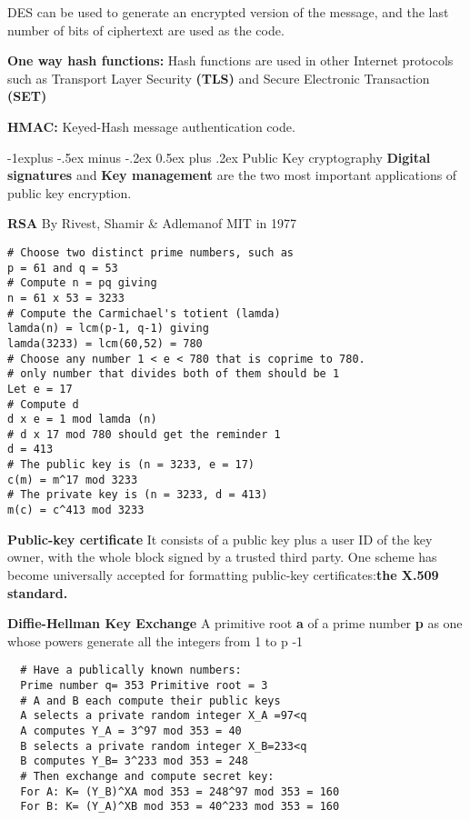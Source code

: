 \documentclass[10pt,landscape]{article}
\makeatletter
\renewcommand{\subsection}{\@startsection{subsection}{2}{0mm}%
    {-1explus -.5ex minus -.2ex}%
    {0.5ex plus .2ex}%
    {\normalfont\normalsize\bfseries}}
\makeatother
\begin{document}
\begin{multicols}{3}
DES can be used to generate an encrypted version of the message, and
the last number of bits of ciphertext are used as the code.

\textbf{One way hash functions:} Hash functions are used in other Internet protocols such as Transport
Layer Security \textbf{(TLS)} and Secure Electronic Transaction \textbf{(SET)}

\textbf{HMAC:} Keyed-Hash message authentication code.

\subsection{Public Key cryptography}
\textbf{Digital signatures} and \textbf{Key management} are the two most important applications of
public key encryption.

\textbf{RSA} By Rivest, Shamir \& Adlemanof MIT in 1977

\lstset{language=bash,label= ,caption= ,captionpos=b,numbers=none}
\begin{lstlisting}
# Choose two distinct prime numbers, such as
p = 61 and q = 53
# Compute n = pq giving
n = 61 x 53 = 3233
# Compute the Carmichael's totient (lamda)
lamda(n) = lcm(p-1, q-1) giving
lamda(3233) = lcm(60,52) = 780
# Choose any number 1 < e < 780 that is coprime to 780.
# only number that divides both of them should be 1
Let e = 17
# Compute d
d x e = 1 mod lamda (n)
# d x 17 mod 780 should get the reminder 1
d = 413
# The public key is (n = 3233, e = 17)
c(m) = m^17 mod 3233
# The private key is (n = 3233, d = 413)
m(c) = c^413 mod 3233
\end{lstlisting}

\textbf{Public-key certificate} It consists of a public key plus a
user ID of the key owner, with the whole block signed by a trusted
third party.
One scheme has become universally accepted for formatting public-key certificates:\textbf{the X.509 standard.} 

\textbf{Diffie-Hellman Key Exchange} A primitive root \textbf{a} of a
prime number \textbf{p} as one whose powers generate all the integers
from 1 to p -1

\lstset{language=bash,label= ,caption=,captionpos=b,numbers=none}
\begin{lstlisting}
  # Have a publically known numbers:
  Prime number q= 353 Primitive root = 3
  # A and B each compute their public keys
  A selects a private random integer X_A =97<q
  A computes Y_A = 3^97 mod 353 = 40
  B selects a private random integer X_B=233<q
  B computes Y_B= 3^233 mod 353 = 248
  # Then exchange and compute secret key:
  For A: K= (Y_B)^XA mod 353 = 248^97 mod 353 = 160
  For B: K= (Y_A)^XB mod 353 = 40^233 mod 353 = 160
\end{lstlisting}


\end{multicols}
\end{document}

